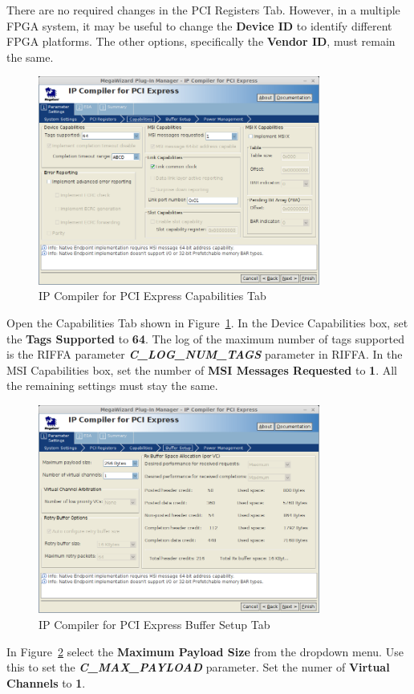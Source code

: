 \documentclass{refrep}
\newcommand{\ConfigSetting}[1]{\textbf{#1}}
\newcommand{\RIFFAParameter}[1]{\textit{\textbf{#1}}}
\begin{document}
There are no required changes in the PCI Registers Tab. However, in a multiple
FPGA system, it may be useful to change the \ConfigSetting{Device ID} to
identify different FPGA platforms. The other options, specifically the
\ConfigSetting{Vendor ID}, must remain the same.
\begin{figure}[H]
  \includegraphics[width=350px,center]{IPCompilerPCIeTabCapabilities.png}
  \caption{IP Compiler for PCI Express Capabilities Tab}
  \label{Fig:Altera:IPCompiler:PCIeCapabilitiesTab}
\end{figure}
Open the Capabilities Tab shown in
Figure~\ref{Fig:Altera:IPCompiler:PCIeCapabilitiesTab}. In the Device
Capabilities box, set the \ConfigSetting{Tags Supported} to
\ConfigSetting{64}. The log of the maximum number of tags supported is the RIFFA
parameter \RIFFAParameter{C\_LOG\_NUM\_TAGS} parameter in RIFFA. In the MSI
Capabilities box, set the number of \ConfigSetting{MSI Messages Requested} to
\ConfigSetting{1}. All the remaining settings must stay the same.
\begin{figure}[H]
  \includegraphics[width=350px,center]{IPCompilerPCIeTabBufferSetup.png}
  \caption{IP Compiler for PCI Express Buffer Setup Tab}
  \label{Fig:Altera:IPCompiler:PCIeBufferSetupTab}
\end{figure}
In Figure~\ref{Fig:Altera:IPCompiler:PCIeBufferSetupTab} select the
\ConfigSetting{Maximum Payload Size} from the dropdown menu. Use this to set the
\RIFFAParameter{C\_MAX\_PAYLOAD} parameter. Set the numer of \ConfigSetting{Virtual Channels} to
\ConfigSetting{1}.
\end{document}

